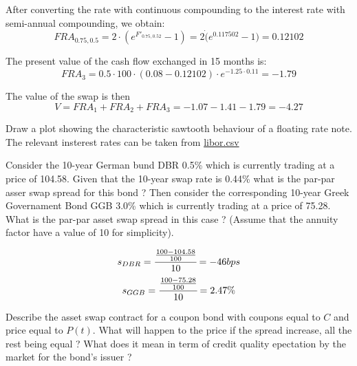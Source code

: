 \documentclass[12pt,a4paper]{book}
\begin{document}
\begin{solution}
After converting the rate with continuous compounding to the interest rate with semi-annual compounding, we obtain:
\begin{equation*}
FRA_{0.75,0.5}=2\cdot(e^{F'_{0.75,0.52}}-1)=2\dot(e^0.117502-1)=0.12102
\end{equation*}

The present value of the cash flow exchanged in 15 months is:
\begin{equation*}
FRA_3=0.5\cdot100\cdot(0.08-0.12102)\cdot e^{-1.25\cdot0.11}=-1.79
\end{equation*}

The value of the swap is then 
\begin{equation*}
V=FRA_1+FRA_2+FRA_3 = -1.07-1.41-1.79=-4.27
\end{equation*}
\end{solution}

\begin{exercise}[subtitle=FRN resetting (\texttt{python})]
Draw a plot showing the characteristic sawtooth behaviour of a floating rate note. The relevant insterest rates can be taken from \href{https://raw.githubusercontent.com/matteosan1/advanced\_financial\_modeling/master/input_files/libor.csv}{libor.csv}
\end{exercise}

\begin{exercise}[subtitle=Asset Swap Spread]
Consider the 10-year German bund DBR 0.5\% which is currently trading at a price of 104.58. Given that the 10-year swap rate is 0.44\% what is the par-par asser swap spread for this bond ? 
Then consider the corresponding 10-year Greek Governament Bond GGB 3.0\% which is currently trading at a price of 75.28. What is the par-par asset swap spread in this case ?
(Assume that the annuity factor have a value of 10 for simplicity).
\end{exercise}
\begin{solution}
\begin{equation*}
s_{DBR} = \cfrac{\frac{100-104.58}{100}}{10} = -46 bps
\end{equation*}
\begin{equation*}
s_{GGB} = \cfrac{\frac{100-75.28}{100}}{10} = 2.47\%
\end{equation*}
\end{solution}

\begin{exercise}[subtitle=Asset Swap]
Describe the asset swap contract for a coupon bond with coupons equal to $C$ and price equal to $P(t)$. 
What will happen to the price if the spread increase, all the rest being equal ?
What does it mean in term of credit quality epectation by the market for the bond's issuer ?
\end{exercise}
\end{document}
